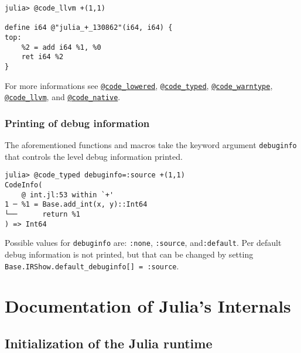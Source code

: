 \begin{verbatim}
julia> @code_llvm +(1,1)

define i64 @"julia_+_130862"(i64, i64) {
top:
    %2 = add i64 %1, %0
    ret i64 %2
}
\end{verbatim}



For more informations see \hyperlink{1376948972689074219}{\texttt{@code\_lowered}}, \hyperlink{6823997547688846780}{\texttt{@code\_typed}}, \hyperlink{8092893264277772840}{\texttt{@code\_warntype}}, \hyperlink{18039596607712979441}{\texttt{@code\_llvm}}, and \hyperlink{2629340111434042067}{\texttt{@code\_native}}.



\hypertarget{4254640328057635583}{}


\subsection{Printing of debug information}



The aforementioned functions and macros take the keyword argument \texttt{debuginfo} that controls the level debug information printed.




\begin{lstlisting}
julia> @code_typed debuginfo=:source +(1,1)
CodeInfo(
    @ int.jl:53 within `+'
1 ─ %1 = Base.add_int(x, y)::Int64
└──      return %1
) => Int64
\end{lstlisting}



Possible values for \texttt{debuginfo} are: \texttt{:none}, \texttt{:source}, and\texttt{:default}. Per default debug information is not printed, but that can be changed by setting \texttt{Base.IRShow.default\_debuginfo[] = :source}.



\chapter{Documentation of Julia's Internals}


\hypertarget{14839170566260018486}{}


\section{Initialization of the Julia runtime}



